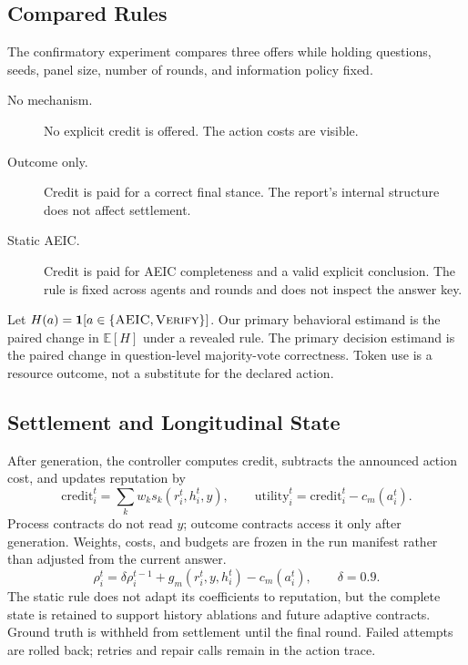 \subsection{Compared Rules}

The confirmatory experiment compares three offers while holding questions, seeds, panel size, number of rounds, and information policy fixed.
\begin{description}
 \item[No mechanism.] No explicit credit is offered. The action costs are visible.
 \item[Outcome only.] Credit is paid for a correct final stance. The report's internal structure does not affect settlement.
 \item[Static AEIC.] Credit is paid for AEIC completeness and a valid explicit conclusion. The rule is fixed across agents and rounds and does not inspect the answer key.
\end{description}

Let $H(a)=\mathbf{1}[a\in\{\textsc{AEIC},\textsc{Verify}\}]$. Our primary behavioral estimand is the paired change in $\mathbb{E}[H]$ under a revealed rule. The primary decision estimand is the paired change in question-level majority-vote correctness. Token use is a resource outcome, not a substitute for the declared action.

\subsection{Settlement and Longitudinal State}

After generation, the controller computes credit, subtracts the announced action cost, and updates reputation by
\begin{equation}
 \mathrm{credit}_i^t=\sum_k w_k s_k(r_i^t,h_i^t,y),\qquad
 \mathrm{utility}_i^t=\mathrm{credit}_i^t-c_m(a_i^t).
\end{equation}
Process contracts do not read $y$; outcome contracts access it only after generation. Weights, costs, and budgets are frozen in the run manifest rather than adjusted from the current answer.
\begin{equation}
 \rho_i^{t}=\delta\rho_i^{t-1}+g_m(r_i^t,y,h_i^t)-c_m(a_i^t),\qquad \delta=0.9.
\end{equation}
The static rule does not adapt its coefficients to reputation, but the complete state is retained to support history ablations and future adaptive contracts. Ground truth is withheld from settlement until the final round. Failed attempts are rolled back; retries and repair calls remain in the action trace.

